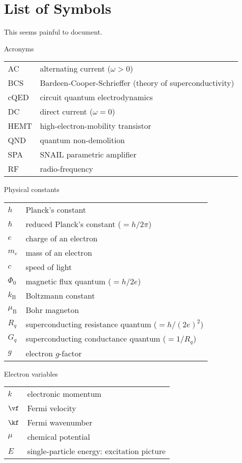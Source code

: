 \chapter*{List of Symbols}
This seems painful to document.


\renewcommand{\arraystretch}{1.4}

{\Large\noindent Acronyms}
\begin{longtable}{ m{5em} m{29em}}
AC & alternating current ($\omega>0$)\\
BCS & Bardeen-Cooper-Schrieffer (theory of superconductivity)\\
cQED & circuit quantum electrodynamics\\
DC & direct current ($\omega=0$)\\
HEMT & high-electron-mobility transistor\\
QND & quantum non-demolition\\
SPA & SNAIL parametric amplifier\\
RF & radio-frequency\\
\end{longtable}
\vspace{.2cm}

{\Large\noindent Physical constants}
\vspace{-.2cm}
\begin{longtable}{ m{5em} m{29em}}
$h$ & Planck's constant \\
$\hbar$ & reduced Planck's constant ($= h / 2\pi$)\\
$e$ & charge of an electron\\
$m_e$ & mass of an electron\\
$c$ & speed of light\\
$\Phi_0$ & magnetic flux quantum ($=h/2e$)\\
$k_\mathrm{B}$ & Boltzmann constant\\
$\mu_\mathrm{B}$ & Bohr magneton\\
$R_q$ & superconducting resistance quantum ($=h/(2e)^2$)\\
$G_q$ & superconducting conductance quantum ($=1/R_q$) \\
$g$ & electron $g$-factor \\
\end{longtable}
\vspace{.2cm}

{\Large\noindent Electron variables}
\vspace{-.2cm}
\begin{longtable}{ m{5em} m{29em}}
$k$ & electronic momentum \\
$\vf$ & Fermi velocity \\
$\kf$ & Fermi wavenumber \\
$\mu$ & chemical potential \\
$E$ & single-particle energy: excitation picture \\
\end{longtable}
\vspace{.2cm}

